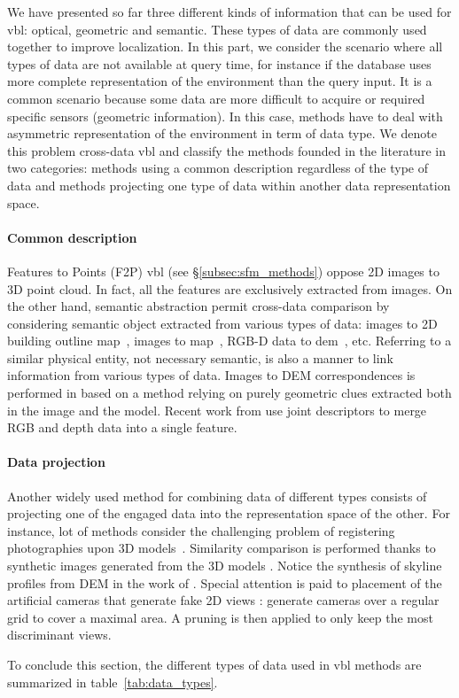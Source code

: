 	\label{subsec:cross_data}        
		We have presented so far three different kinds of information that can be used for \ac{vbl}: optical, geometric and semantic. These types of data are commonly used together to improve localization. In this part, we consider the scenario where all types of data are not available at query time, for instance if the database uses more complete representation of the environment than the query input. It is a common scenario because some data are more difficult to acquire or required specific sensors (\eg geometric information). In this case, methods have to deal with asymmetric representation of the environment in term of data type. We denote this problem cross-data \ac{vbl} and classify the methods founded in the literature in two categories: methods using a common description regardless of the type of data and methods projecting one type of data within another data representation space.
		
    	\paragraph{Common description}
    		Features to Points (F2P) \ac{vbl} (see \S\ref{subsec:sfm_methods}) oppose 2D images to 3D point cloud. In fact, all the features are exclusively extracted from images. On the other hand, semantic abstraction permit cross-data comparison by considering semantic object extracted from various types of data: images to 2D building outline map~\citep{Cham2010}, images to map~\citep{Ardeshir2014,Qu2015,Castaldo2015,Brubaker2016}, RGB-D data to \ac{dem}~\citep{Christie2016}, etc. Referring to a similar physical entity, not necessary semantic, is also a manner to link information from various types of data. Images to DEM correspondences is performed in \citep{Bansal2014} based on a method relying on purely geometric clues extracted both in the image and the model. Recent work from \citep{Sizikova2016,Li2017} use joint descriptors to merge RGB and depth data into a single feature.
					
		\paragraph{Data projection}
			Another widely used method for combining data of different types consists of projecting one of the engaged data into the representation space of the other. For instance, lot of methods consider the challenging problem of registering photographies upon 3D models~\citep{Baatz2012,Kendall2015,Arth2015,Pascoe2015,Pascoe2015a,Pascoe2015b}. Similarity comparison is performed thanks to synthetic images generated from the 3D models \citep{Russell2011,Mason2011,Aubry2014,Poglitsch2015}. Notice the synthesis of skyline profiles from DEM in the work of \citet{Baatz2012}. Special attention is paid to placement of the artificial cameras that generate fake 2D views \citep{Irschara2009,Gee2012,Torii2015}: \citet{Aubry2014} generate cameras over a regular grid to cover a maximal area. A pruning is then applied to only keep the most discriminant views.

To conclude this section, the different types of data used in \ac{vbl} methods are summarized in table~\ref{tab:data_types}.

